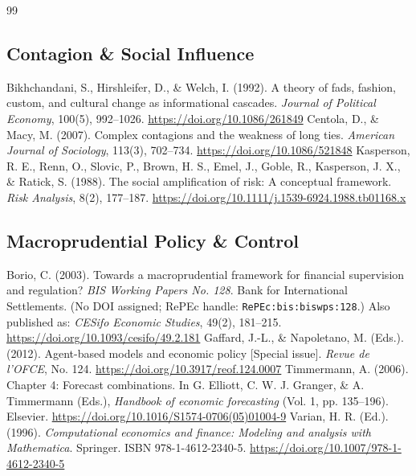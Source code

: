 \documentclass[11pt]{article}
\begin{document}
\begin{thebibliography}{99}
\subsection{Contagion \& Social Influence}
 Bikhchandani, S., Hirshleifer, D., \& Welch, I. (1992). A theory of fads, fashion, custom, and cultural change as informational cascades. \textit{Journal of Political Economy}, 100(5), 992--1026. \url{https://doi.org/10.1086/261849}
 Centola, D., \& Macy, M. (2007). Complex contagions and the weakness of long ties. \textit{American Journal of Sociology}, 113(3), 702--734. \url{https://doi.org/10.1086/521848}
 Kasperson, R. E., Renn, O., Slovic, P., Brown, H. S., Emel, J., Goble, R., Kasperson, J. X., \& Ratick, S. (1988). The social amplification of risk: A conceptual framework. \textit{Risk Analysis}, 8(2), 177--187. \url{https://doi.org/10.1111/j.1539-6924.1988.tb01168.x}
\subsection{Macroprudential Policy \& Control}
 Borio, C. (2003). Towards a macroprudential framework for financial supervision and regulation? \textit{BIS Working Papers No. 128}. Bank for International Settlements. (No DOI assigned; RePEc handle: \texttt{RePEc:bis:biswps:128}.) Also published as: \textit{CESifo Economic Studies}, 49(2), 181--215. \url{https://doi.org/10.1093/cesifo/49.2.181}
 Gaffard, J.-L., \& Napoletano, M. (Eds.). (2012). Agent-based models and economic policy [Special issue]. \textit{Revue de l'OFCE}, No. 124. \url{https://doi.org/10.3917/reof.124.0007}
 Timmermann, A. (2006). Chapter 4: Forecast combinations. In G. Elliott, C. W. J. Granger, \& A. Timmermann (Eds.), \textit{Handbook of economic forecasting} (Vol. 1, pp. 135--196). Elsevier. \url{https://doi.org/10.1016/S1574-0706(05)01004-9}
 Varian, H. R. (Ed.). (1996). \textit{Computational economics and finance: Modeling and analysis with Mathematica\textregistered}. Springer. ISBN 978-1-4612-2340-5. \url{https://doi.org/10.1007/978-1-4612-2340-5}

\end{thebibliography}
\end{document}

